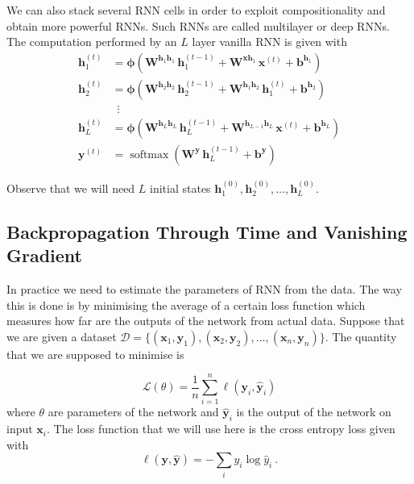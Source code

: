 \documentclass[titlepage]{report}
\DeclareMathOperator{\softmax}{softmax}
\begin{document}
We can also stack several RNN cells in order to exploit compositionality and obtain more powerful RNNs. Such RNNs are called multilayer or deep RNNs. The computation performed by an $L$ layer vanilla RNN is given with
\begin{align*}
\mathbf{h}_1^{(t)} &= \boldsymbol{\phi} \left( \mathbf{W}^{\mathbf{h}_1 \mathbf{h}_1} \, \mathbf{h}_1^{(t - 1)} + \mathbf{W}^{\mathbf{x} \mathbf{h}_1} \, \mathbf{x}^{(t)} + \mathbf{b}^{\mathbf{h}_1} \right) \\
\mathbf{h}_2^{(t)} &= \boldsymbol{\phi} \left( \mathbf{W}^{\mathbf{h}_2 \mathbf{h}_2} \, \mathbf{h}_2^{(t - 1)} + \mathbf{W}^{\mathbf{h}_1 \mathbf{h}_2} \, \mathbf{h}_1^{(t)} + \mathbf{b}^{\mathbf{h}_2} \right) \\
& \enspace \vdots \\
\mathbf{h}_L^{(t)} &= \boldsymbol{\phi} \left( \mathbf{W}^{\mathbf{h}_L \mathbf{h}_L} \, \mathbf{h}_L^{(t - 1)} + \mathbf{W}^{\mathbf{h}_{L-1} \mathbf{h}_L} \, \mathbf{x}^{(t)} + \mathbf{b}^{\mathbf{h}_L} \right) \\
\mathbf{y}^{(t)} &= \softmax \left( \mathbf{W}^{\mathbf{y}} \, \mathbf{h}_L^{(t - 1)} + \mathbf{b}^{\mathbf{y}} \right)
\end{align*}

\begin{center}
\end{center}

Observe that we will need $L$ initial states $\mathbf{h}_1^{(0)}, \mathbf{h}_2^{(0)}, \ldots, \mathbf{h}_L^{(0)}$.

\subsection{Backpropagation Through Time and Vanishing Gradient}

In practice we need to estimate the parameters of RNN from the data. The way this is done is by minimising the average of a certain loss function which measures how far are the outputs of the network from actual data. Suppose that we are given a dataset $\mathcal{D} = \{ (\mathbf{x}_1, \mathbf{y}_1), (\mathbf{x}_2, \mathbf{y}_2), \ldots, (\mathbf{x}_n, \mathbf{y}_n) \}$. The quantity that we are supposed to minimise is

\begin{equation*}
\mathcal{L}(\theta) = \frac{1}{n} \sum_{i = 1}^n \ell(\mathbf{y}_i, \mathbf{\hat{y}}_i)
\end{equation*}
where $\theta$ are parameters of the network and $\mathbf{\hat{y}}_i$ is the output of the network on input $\mathbf{x}_i$. The loss function that we will use here is the cross entropy loss given with
\begin{equation*}
\ell(\mathbf{y}, \mathbf{\hat{y}}) = - \sum_i y_i \log \hat{y}_i \: .
\end{equation*}
\end{document}
